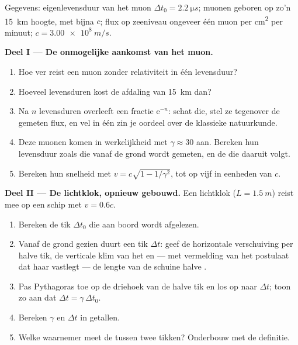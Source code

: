 \begin{problem}
\label{pb:g12:special-relativity:1}
Gegevens: eigenlevensduur van het muon $\Delta t_0 = \qty{2.2}{\micro s}$;
muonen geboren op zo'n \qty{15}{km} hoogte, met bijna $c$; flux op zeeniveau
ongeveer één muon per \unit{cm^2} per minuut; $c = \qty{3.00e8}{m/s}$.

\medskip
\noindent\textbf{Deel I --- De onmogelijke aankomst van het muon.}
\begin{enumerate}
  \item Hoe ver reist een muon zonder relativiteit in één levensduur?
  \item Hoeveel levensduren kost de afdaling van \qty{15}{km} dan?
  \item Na $n$ levensduren overleeft een fractie $\mathrm{e}^{-n}$: schat die,
        stel ze tegenover de gemeten flux, en vel in één zin je oordeel over de
        klassieke natuurkunde.
  \item Deze muonen komen in werkelijkheid met $\gamma \approx 30$ aan.
        Bereken hun levensduur zoals die vanaf de grond wordt gemeten, en de
         die daaruit volgt.
  \item Bereken hun snelheid met $v = c\sqrt{1 - 1/\gamma^2}$, tot op vijf
         in eenheden van $c$.
\end{enumerate}

\medskip
\noindent\textbf{Deel II --- De lichtklok, opnieuw gebouwd.}
Een lichtklok ($L = \qty{1.5}{m}$) reist mee op een schip met $v = 0.6c$.
\begin{enumerate}[resume]
  \item Bereken de tik $\Delta t_0$ die aan boord wordt afgelezen.
  \item Vanaf de grond gezien duurt een tik $\Delta t$: geef de horizontale
        verschuiving per halve tik, de verticale klim van het  en ---
        met vermelding van het postulaat dat haar vastlegt --- de lengte van de
        schuine halve .
  \item Pas Pythagoras toe op de driehoek van de halve tik en los op naar
        $\Delta t$; toon zo aan dat $\Delta t = \gamma\,\Delta t_0$.
  \item Bereken $\gamma$ en $\Delta t$ in getallen.
  \item Welke waarnemer meet de  tussen twee tikken? Onderbouw met de
        definitie.
\end{enumerate}


\end{problem}
